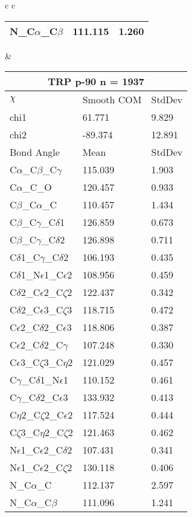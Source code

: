 \begin{longtable}{ c c }
\begin{tabular}{ l l l }
  N\_C$\alpha$\_C$\beta$ & 111.115 & 1.260\\
  \bottomrule
  \end{tabular}
  &
  \begin{tabular}{ l l l }
  \toprule
  \multicolumn{3}{c}{TRP \textbf{p-90} n = 1937} \\ \toprule
  $\chi$       & Smooth COM & StdDev \\ \midrule
  chi1 & 61.771 & 9.829 \\ 
  chi2 & -89.374 & 12.891 \\ \midrule
  Bond Angle   & Mean     & StdDev \\ \midrule
  C$\alpha$\_C$\beta$\_C$\gamma$ & 115.039 & 1.903\\
  C$\alpha$\_C\_O & 120.457 & 0.933\\
  C$\beta$\_C$\alpha$\_C & 110.457 & 1.434\\
  C$\beta$\_C$\gamma$\_C$\delta$1 & 126.859 & 0.673\\
  C$\beta$\_C$\gamma$\_C$\delta$2 & 126.898 & 0.711\\
  C$\delta$1\_C$\gamma$\_C$\delta$2 & 106.193 & 0.435\\
  C$\delta$1\_N$\epsilon$1\_C$\epsilon$2 & 108.956 & 0.459\\
  C$\delta$2\_C$\epsilon$2\_C$\zeta$2 & 122.437 & 0.342\\
  C$\delta$2\_C$\epsilon$3\_C$\zeta$3 & 118.715 & 0.472\\
  C$\epsilon$2\_C$\delta$2\_C$\epsilon$3 & 118.806 & 0.387\\
  C$\epsilon$2\_C$\delta$2\_C$\gamma$ & 107.248 & 0.330\\
  C$\epsilon$3\_C$\zeta$3\_C$\eta$2 & 121.029 & 0.457\\
  C$\gamma$\_C$\delta$1\_N$\epsilon$1 & 110.152 & 0.461\\
  C$\gamma$\_C$\delta$2\_C$\epsilon$3 & 133.932 & 0.413\\
  C$\eta$2\_C$\zeta$2\_C$\epsilon$2 & 117.524 & 0.444\\
  C$\zeta$3\_C$\eta$2\_C$\zeta$2 & 121.463 & 0.462\\
  N$\epsilon$1\_C$\epsilon$2\_C$\delta$2 & 107.431 & 0.341\\
  N$\epsilon$1\_C$\epsilon$2\_C$\zeta$2 & 130.118 & 0.406\\
  N\_C$\alpha$\_C & 112.137 & 2.597\\
  N\_C$\alpha$\_C$\beta$ & 111.096 & 1.241\\
  \bottomrule
  \end{tabular}

\end{longtable}
